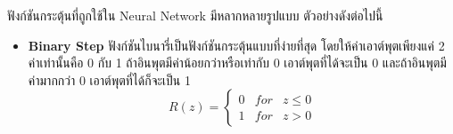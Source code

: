 ฟังก์ชันกระตุ้นที่ถูกใช้ใน Neural Network มีหลากหลายรูปแบบ ตัวอย่างดังต่อไปนี้
%
\begin{itemize}
    \item \textbf{Binary Step} ฟังก์ชันไบนารี่เป็นฟังก์ชันกระตุ้นแบบที่ง่ายที่สุด โดยให้ค่าเอาต์พุตเพียงแค่ 2 ค่าเท่านั้นคือ 0 กับ 1
          ถ้าอินพุตมีค่าน้อยกว่าหรือเท่ากับ 0 เอาต์พุตที่ได้จะเป็น 0 และถ้าอินพุตมีค่ามากกว่า 0 เอาต์พุตที่ได้ก็จะเป็น 1
          \begin{equation}
              R(z) = \left\{
              \begin{array}{lll}
                  0 & for & z \leq 0 \\
                  1 & for & z > 0
              \end{array}
              \right.
          \end{equation}


\end{itemize}
